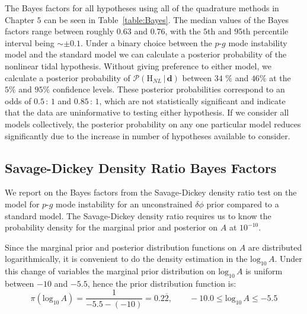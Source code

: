 The Bayes factors for all hypotheses using all of the quadrature methods in Chapter $5$ can be seen in Table~\ref{table:Bayes}. The median values of the Bayes factors range between roughly $0.63$ and $0.76$, with the $5$th and $95$th percentile interval being $\sim \pm 0.1$. Under a binary choice between the $p$-$g$ mode instability model and the standard model we can calculate a posterior probability of the nonlinear tidal hypothesis. Without giving preference to either model, we calculate a posterior probability of $\mathcal{P}(\mathrm{H}_{NL} \, | \, \mathbf{d})$ between $34$ \%  and $46 \%$ at the $5 \%$ and $95 \%$ confidence levels. These posterior probabilities correspond to an odds of $0.5 \, : \, 1$ and $0.85 \, : \, 1$, which are not statistically significant and indicate that the data are uninformative to testing either hypothesis. If we consider all models collectively, the posterior probability on any one particular model reduces significantly due to the increase in number of hypotheses available to consider.

\subsection{Savage-Dickey Density Ratio Bayes Factors}\label{sec:prob_density_estimator_performance}
We report on the Bayes factors from the Savage-Dickey density ratio test on the model for $p$-$g$ mode instability for an unconstrained $\delta \phi$ prior compared to a standard model. The Savage-Dickey density ratio requires us to know the probability density for the marginal prior and posterior on $A$ at $10^{-10}$.

Since the marginal prior and posterior distribution functions on $A$ are distributed logarithmically, it is convenient to do the density estimation in the $\mathrm{log}_{10} \, A$. Under this change of variables the marginal prior distribution on $\mathrm{log}_{10} \, A$ is uniform between $-10$ and $-5.5$, hence the prior distribution function is:
\begin{equation}
    \pi\left(\mathrm{log}_{10} \, A\right) = \frac{1}{-5.5 - (-10)} = 0.2\overbar{2}, \qquad -10.0 \leq \mathrm{log}_{10} \, A \leq -5.5
\end{equation}

